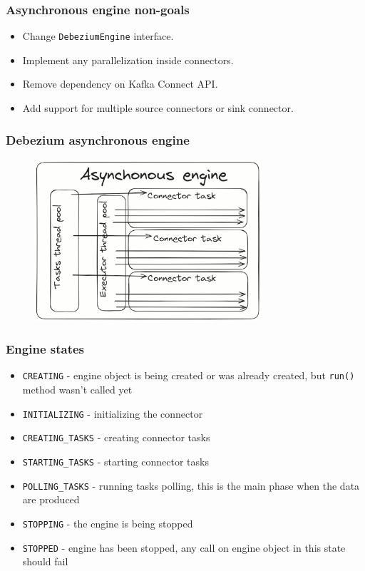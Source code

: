 \documentclass[10pt,utf8]{beamer}
\begin{document}
\begin{frame}
    \frametitle{Asynchronous engine non-goals}
    \begin{itemize}
        \item Change \texttt{DebeziumEngine} interface.
        \item Implement any parallelization inside connectors.
        \item Remove dependency on Kafka Connect API.
        \item Add support for multiple source connectors or sink connector.
    \end{itemize}
\end{frame}


\begin{frame}
    \frametitle{Debezium asynchronous engine}
    \begin{figure}
        \centering
        \includegraphics[height=6cm]{./img/async_engine.eps}
    \end{figure}
\end{frame}

\begin{frame}
    \frametitle{Engine states}
    \begin{itemize}
        \item \texttt{CREATING} - engine object is being created or was already created, but \texttt{run()} method wasn't called yet
        \item \texttt{INITIALIZING} - initializing the connector
        \item \texttt{CREATING\_TASKS} - creating connector tasks
        \item \texttt{STARTING\_TASKS} - starting connector tasks
        \item \texttt{POLLING\_TASKS} - running tasks polling, this is the main phase when the data are produced
        \item \texttt{STOPPING} - the engine is being stopped
        \item \texttt{STOPPED} - engine has been stopped, any call on engine object in this state should fail
    \end{itemize}
\end{frame}
\end{document}
